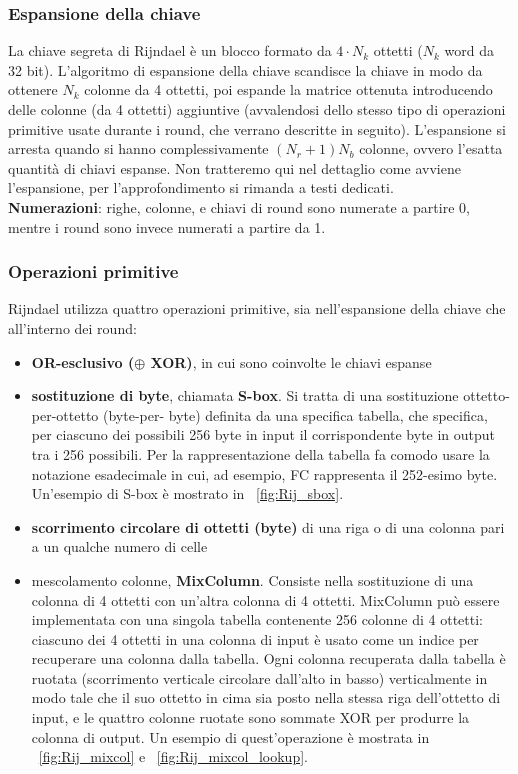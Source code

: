 \subsubsection{Espansione della chiave}
La chiave segreta di Rijndael è un blocco formato da $4 \cdot N_{k}$ ottetti ($N_{k}$ word da 32 bit). L'algoritmo di espansione della chiave scandisce la chiave in modo da ottenere $N_{k}$ colonne da 4 ottetti, poi espande la matrice ottenuta introducendo delle colonne (da 4 ottetti) aggiuntive (avvalendosi dello stesso tipo di operazioni primitive usate durante i round, che verrano descritte in seguito). L'espansione si arresta quando si hanno complessivamente $(N_{r} + 1)N_{b}$ colonne, ovvero l'esatta quantità di chiavi espanse. Non tratteremo qui nel dettaglio come avviene l'espansione, per l'approfondimento si rimanda a testi dedicati.\\

\textbf{Numerazioni}: righe, colonne, e chiavi di round sono numerate a
partire 0, mentre i round sono invece numerati a partire da 1.

\subsubsection{Operazioni primitive}
Rijndael utilizza quattro operazioni primitive, sia nell'espansione della chiave che all'interno dei round:
\begin{itemize}
  \item \textbf{OR-esclusivo ($\oplus$ XOR)}, in cui sono coinvolte le chiavi espanse
  \item \textbf{sostituzione di byte}, chiamata \textbf{S-box}. Si tratta di una sostituzione ottetto-per-ottetto (byte-per- byte) definita da una specifica tabella, che specifica, per ciascuno dei possibili 256 byte in input il corrispondente byte in output tra i 256 possibili. Per la rappresentazione della tabella fa comodo usare la notazione esadecimale in cui, ad esempio, FC rappresenta il 252-esimo byte. Un'esempio di S-box è mostrato in \figurename ~\ref{fig:Rij_sbox}.
  \item \textbf{scorrimento circolare di ottetti (byte)} di una riga o di una colonna pari a un qualche numero di celle
  \item mescolamento colonne, \textbf{MixColumn}. Consiste nella sostituzione di una colonna di 4 ottetti con un'altra colonna di 4 ottetti. MixColumn può essere implementata con una singola tabella contenente 256 colonne di 4 ottetti: ciascuno dei 4 ottetti in una colonna di input è usato come un indice per recuperare una colonna dalla tabella. Ogni colonna recuperata dalla tabella è ruotata (scorrimento verticale circolare dall'alto in basso) verticalmente in modo tale che il suo ottetto in cima sia posto nella stessa riga dell’ottetto di input, e le quattro colonne ruotate sono sommate XOR per produrre la colonna di output. Un esempio di quest'operazione è mostrata in \figurename ~\ref{fig:Rij_mixcol} e \figurename ~\ref{fig:Rij_mixcol_lookup}.
\end{itemize}

